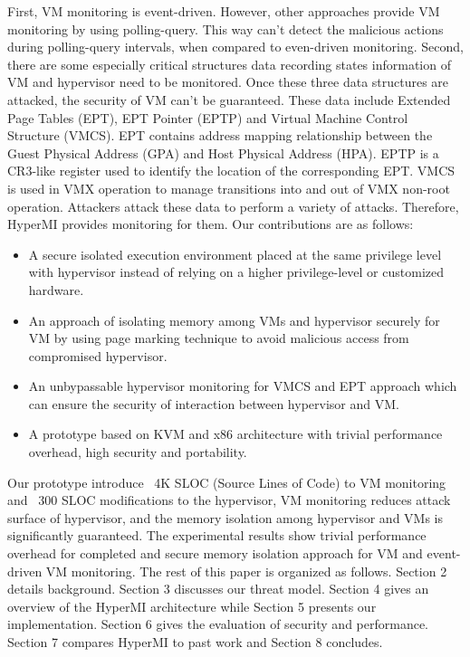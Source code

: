\documentclass[conference]{IEEEtran}
\begin{document}
First, VM monitoring is event-driven. However, other approaches provide VM monitoring by using polling-query. This way can't detect the malicious actions during polling-query intervals,
when compared to even-driven monitoring. 
Second, there are some especially critical structures data recording states information of VM and hypervisor need to be monitored. Once these three data structures are attacked, the security of VM can't be guaranteed. These data include Extended Page Tables (EPT), EPT Pointer (EPTP) and Virtual Machine Control Structure (VMCS). EPT contains address mapping relationship between the Guest Physical Address (GPA) and Host Physical Address (HPA). EPTP is a CR3-like register used to identify the location of the corresponding EPT. VMCS is used in VMX operation to manage transitions into and out of VMX non-root operation. 
Attackers attack these data to perform a variety of attacks. Therefore, HyperMI provides monitoring for them.
Our contributions are as follows:
\begin{itemize}
\item A secure isolated execution environment placed at the same privilege level with hypervisor instead of relying on a higher privilege-level or customized hardware.
\item{An approach of isolating memory among VMs and hypervisor securely for VM by using page marking technique to avoid malicious access from compromised hypervisor.}
\item{An unbypassable hypervisor monitoring for VMCS and EPT approach which can ensure the security of interaction between hypervisor and VM.}
\item{A prototype based on KVM and x86 architecture with trivial performance overhead, high security and portability.}
\end{itemize}
Our prototype introduce ~4K SLOC (Source Lines of Code) to VM monitoring and ~300 SLOC modifications to the hypervisor, VM monitoring reduces attack surface of hypervisor, and the memory isolation among hypervisor and VMs is significantly guaranteed. The experimental results show trivial performance overhead for completed and secure memory isolation approach for VM and event-driven VM monitoring.
The rest of this paper is organized as follows. Section 2 details background. Section 3 discusses our threat model. Section 4 gives an overview of the HyperMI architecture while Section 5 presents our implementation. Section 6 gives the evaluation of security and performance. Section 7 compares HyperMI to past work and Section 8 concludes.
\end{document}

